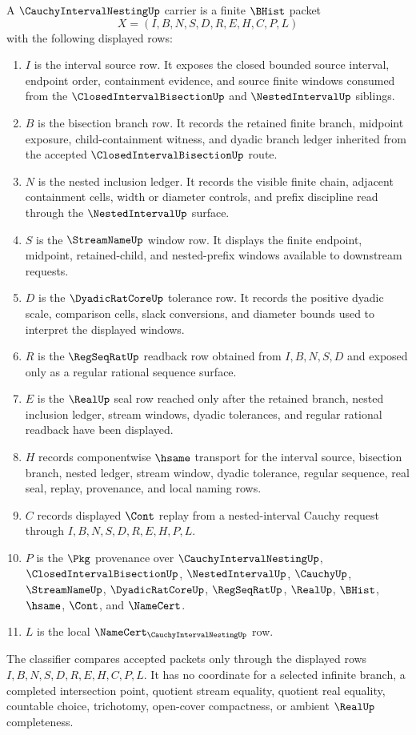 \begin{definition}
\label{def:cauchy-interval-nesting-carrier}
A $\CauchyIntervalNestingUp$ carrier is a finite $\BHist$ packet
$$
X=(I,B,N,S,D,R,E,H,C,P,L)
$$
with the following displayed rows:
\begin{enumerate}
\item $I$ is the interval source row. It exposes the closed bounded source interval, endpoint order, containment evidence, and source finite windows consumed from the $\ClosedIntervalBisectionUp$ and $\NestedIntervalUp$ siblings.
\item $B$ is the bisection branch row. It records the retained finite branch, midpoint exposure, child-containment witness, and dyadic branch ledger inherited from the accepted $\ClosedIntervalBisectionUp$ route.
\item $N$ is the nested inclusion ledger. It records the visible finite chain, adjacent containment cells, width or diameter controls, and prefix discipline read through the $\NestedIntervalUp$ surface.
\item $S$ is the $\StreamNameUp$ window row. It displays the finite endpoint, midpoint, retained-child, and nested-prefix windows available to downstream requests.
\item $D$ is the $\DyadicRatCoreUp$ tolerance row. It records the positive dyadic scale, comparison cells, slack conversions, and diameter bounds used to interpret the displayed windows.
\item $R$ is the $\RegSeqRatUp$ readback row obtained from $I,B,N,S,D$ and exposed only as a regular rational sequence surface.
\item $E$ is the $\RealUp$ seal row reached only after the retained branch, nested inclusion ledger, stream windows, dyadic tolerances, and regular rational readback have been displayed.
\item $H$ records componentwise $\hsame$ transport for the interval source, bisection branch, nested ledger, stream window, dyadic tolerance, regular sequence, real seal, replay, provenance, and local naming rows.
\item $C$ records displayed $\Cont$ replay from a nested-interval Cauchy request through $I,B,N,S,D,R,E,H,P,L$.
\item $P$ is the $\Pkg$ provenance over $\CauchyIntervalNestingUp$, $\ClosedIntervalBisectionUp$, $\NestedIntervalUp$, $\CauchyUp$, $\StreamNameUp$, $\DyadicRatCoreUp$, $\RegSeqRatUp$, $\RealUp$, $\BHist$, $\hsame$, $\Cont$, and $\NameCert$.
\item $L$ is the local $\NameCert_{\CauchyIntervalNestingUp}$ row.
\end{enumerate}
The classifier compares accepted packets only through the displayed rows $I,B,N,S,D,R,E,H,C,P,L$. It has no coordinate for a selected infinite branch, a completed intersection point, quotient stream equality, quotient real equality, countable choice, trichotomy, open-cover compactness, or ambient $\RealUp$ completeness.
\end{definition}

